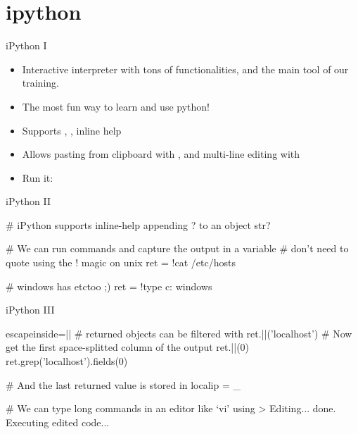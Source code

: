 \section{ipython}



\begin{pyframe}{iPython I}
\begin{itemize}
\item Interactive interpreter with tons of                                                                                                        functionalities, and the main tool of our training.                                                                                                      
\item   The most fun way to learn and use python!

\item   Supports , , inline help 

\item   Allows pasting from clipboard with  , 
    and multi-line editing with 

\item   Run it: \\
\end{itemize}

\end{pyframe}


\begin{pyframe}{iPython II}
\begin{pycode}
# iPython supports inline-help appending ? to an object
str?

# We can run commands and capture the output in a variable
# don't need to quote using the ! magic on unix
ret = !cat /etc/hosts

# windows has etc\hosts too ;)
ret = !type c: windows\drivers\etc\hosts
\end{pycode}
\end{pyframe}


\begin{pyframe}{iPython III}
\begin{pycode*}{escapeinside=||}
# returned objects can be filtered with  
ret.||('localhost')
# Now get the first space-splitted column of the output
ret.||(0)
ret.grep('localhost').fields(0)

# And the last returned value is stored in 
localip = _

# We can type long commands in an editor like `vi' using
> Editing... done. Executing edited code...

\end{pycode*}
\end{pyframe}

